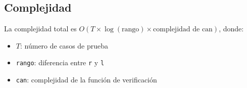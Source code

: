 \subsection{Complejidad}
La complejidad total es $O(T \times \log(\text{rango}) \times \text{complejidad de can})$, donde:
\begin{itemize}
	\item $T$: número de casos de prueba
	\item \texttt{rango}: diferencia entre \texttt{r} y \texttt{l}
	\item \texttt{can}: complejidad de la función de verificación
\end{itemize}



